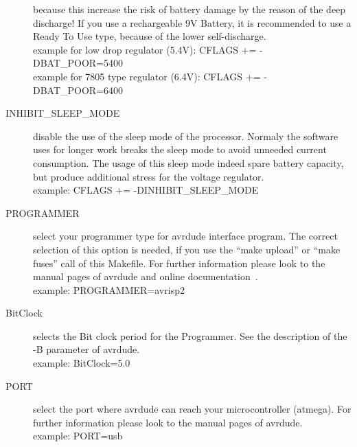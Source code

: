 \begin{description}
because this increase the risk of battery damage by the reason of the deep discharge!
If you use a rechargeable 9V Battery, it is recommended to use a Ready To Use type, because of the lower self-discharge.\\
example for low drop regulator (5.4V): CFLAGS += -DBAT\_POOR=5400\\
example for 7805 type regulator (6.4V): CFLAGS += -DBAT\_POOR=6400
  \item[INHIBIT\_SLEEP\_MODE] disable the use of the sleep mode of the processor.
Normaly the software uses for longer work breaks the sleep mode to avoid unneeded current consumption.
The usage of this sleep mode indeed spare battery capacity, but produce additional stress for the voltage regulator.\\
example: CFLAGS += -DINHIBIT\_SLEEP\_MODE

  \item[PROGRAMMER] select your programmer type for avrdude interface program.
The correct selection of this option is needed, if you use the ``make upload'' or ``make fuses'' call
of this Makefile.
For further information please look to the manual pages of avrdude and online documentation~\cite{avrdude}.\\
example: PROGRAMMER=avrisp2
  \item[BitClock] selects the Bit clock period for the Programmer. See the description of the -B parameter of avrdude.\\
example: BitClock=5.0
  \item[PORT] select the port where avrdude can reach your microcontroller (atmega).
For further information please look to the manual pages of avrdude.\\
example: PORT=usb

\end{description}

